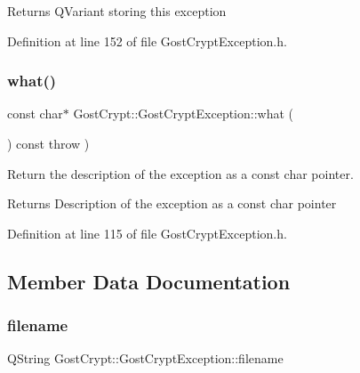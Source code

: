 \begin{DoxyReturn}{Returns}
Q\+Variant storing this exception 
\end{DoxyReturn}


Definition at line 152 of file Gost\+Crypt\+Exception.\+h.

\mbox{\label{class_gost_crypt_1_1_gost_crypt_exception_aa7004879bd9bf6f241d5c9484195b9c9}} 
\subsubsection{\texorpdfstring{what()}{what()}}
{\footnotesize\ttfamily const char$\ast$ Gost\+Crypt\+::\+Gost\+Crypt\+Exception\+::what (\begin{DoxyParamCaption}{ }\end{DoxyParamCaption}) const throw  ) \hspace{0.3cm}{\ttfamily [inline]}}



Return the description of the exception as a const char pointer. 

\begin{DoxyReturn}{Returns}
Description of the exception as a const char pointer 
\end{DoxyReturn}


Definition at line 115 of file Gost\+Crypt\+Exception.\+h.



\subsection{Member Data Documentation}
\mbox{\label{class_gost_crypt_1_1_gost_crypt_exception_a749a12375f4ba9d502623b99d8252f38}} 
\subsubsection{\texorpdfstring{filename}{filename}}
{\footnotesize\ttfamily Q\+String Gost\+Crypt\+::\+Gost\+Crypt\+Exception\+::filename\hspace{0.3cm}{\ttfamily [protected]}}


